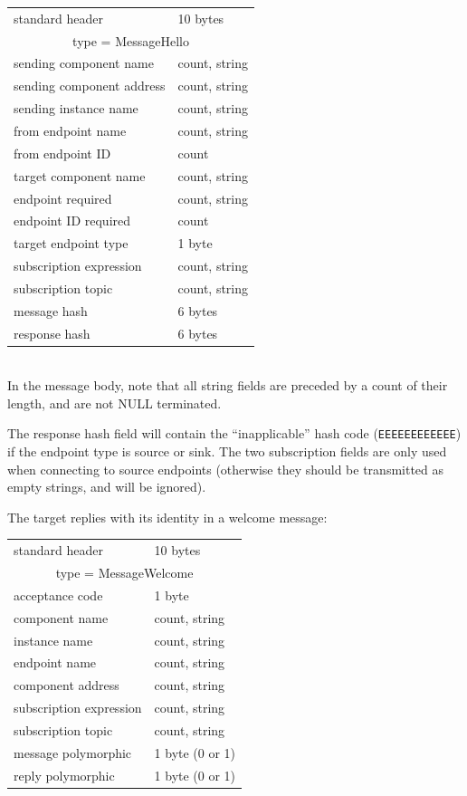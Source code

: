 \documentclass[12pt,a4paper,twoside]{article}
\renewcommand{\_}{\texttt{\symbol{95}}}
\begin{document}
\begin{tabular}{|ll|}
\hline
standard header    & 10 bytes\\
\multicolumn{2}{|c|}{type = MessageHello}\\
\hline
sending component name    & count, string\\
sending component address & count, string\\
sending instance name     & count, string\\
from endpoint name        & count, string\\
from endpoint ID          & count\\
target component name     & count, string\\
endpoint required         & count, string\\
endpoint ID required      & count\\
target endpoint type      & 1 byte\\
subscription expression   & count, string\\
subscription topic        & count, string\\
message hash              & 6 bytes\\
response hash             & 6 bytes\\
\hline
\end{tabular}\\

In the message body, note that all string fields are preceded by a count
of their length, and are not NULL terminated.

The response hash field will contain the ``inapplicable'' hash code
(\verb^EEEEEEEEEEEE^) if the endpoint
type is source or sink. The two subscription fields are only used
when connecting to source endpoints (otherwise they should be
transmitted as empty strings, and will be ignored).

The target replies with its identity in a welcome message:

\begin{tabular}{|ll|}
\hline
standard header    & 10 bytes\\
\multicolumn{2}{|c|}{type = MessageWelcome}\\
\hline
acceptance code    & 1 byte\\
component name     & count, string\\
instance name      & count, string\\
endpoint name      & count, string\\
component address  & count, string\\
subscription expression & count, string\\
subscription topic      & count, string\\
message polymorphic     & 1 byte (0 or 1)\\
reply polymorphic       & 1 byte (0 or 1)\\
\hline
\end{tabular}\\
\end{document}
